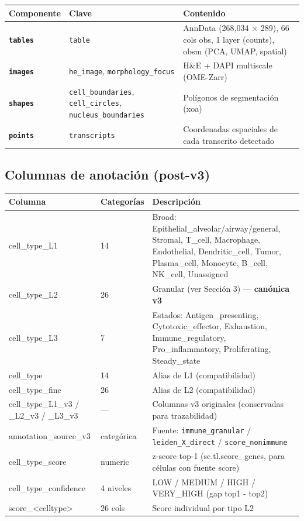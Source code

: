 \documentclass[11pt,a4paper]{article}
\begin{document}
\begin{longtable}{|>{\bfseries}p{3.5cm}|p{4cm}|p{6cm}|}
\hline
\rowcolor{lightgray}\textbf{Componente} & \textbf{Clave} & \textbf{Contenido} \\
\hline
\texttt{tables} & \texttt{table} & AnnData (268{,}034 × 289), 66 cols obs, 1 layer (counts), obsm (PCA, UMAP, spatial) \\
\hline
\texttt{images} & \texttt{he\_image}, \texttt{morphology\_focus} & H\&E + DAPI multiscale (OME-Zarr) \\
\hline
\texttt{shapes} & \texttt{cell\_boundaries}, \texttt{cell\_circles}, \texttt{nucleus\_boundaries} & Polígonos de segmentación (xoa) \\
\hline
\texttt{points} & \texttt{transcripts} & Coordenadas espaciales de cada transcrito detectado \\
\hline
\end{longtable}

\subsection{Columnas de anotación (post-v3)}

\begin{longtable}{|>{\ttfamily}l|p{2.5cm}|p{8cm}|}
\hline
\rowcolor{lightgray}\textbf{Columna} & \textbf{Categorías} & \textbf{Descripción} \\
\hline
cell\_type\_L1 & 14 & Broad: Epithelial\_alveolar/airway/general, Stromal, T\_cell, Macrophage, Endothelial, Dendritic\_cell, Tumor, Plasma\_cell, Monocyte, B\_cell, NK\_cell, Unassigned \\
\hline
cell\_type\_L2 & 26 & Granular (ver Sección 3) — \textbf{canónica v3} \\
\hline
cell\_type\_L3 & 7 & Estados: Antigen\_presenting, Cytotoxic\_effector, Exhaustion, Immune\_regulatory, Pro\_inflammatory, Proliferating, Steady\_state \\
\hline
cell\_type & 14 & Alias de L1 (compatibilidad) \\
\hline
cell\_type\_fine & 26 & Alias de L2 (compatibilidad) \\
\hline
cell\_type\_L1\_v3 / \_L2\_v3 / \_L3\_v3 & — & Columnas v3 originales (conservadas para trazabilidad) \\
\hline
annotation\_source\_v3 & categórica & Fuente: \texttt{immune\_granular} / \texttt{leiden\_X\_direct} / \texttt{score\_nonimmune} \\
\hline
cell\_type\_score & numeric & z-score top-1 (sc.tl.score\_genes, para células con fuente score) \\
\hline
cell\_type\_confidence & 4 niveles & LOW / MEDIUM / HIGH / VERY\_HIGH (gap top1 - top2) \\
\hline
score\_<celltype> & 26 cols & Score individual por tipo L2 \\
\hline
\end{longtable}
\end{document}
